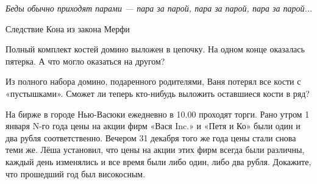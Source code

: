 \epigraph{\textit{Беды обычно приходят парами — пара за парой, пара за парой, пара за парой...}}{Следствие Кона из закона Мерфи}

\begin{thm}\label{1.10}
	Полный комплект костей домино выложен в цепочку. На одном конце оказалась пятерка. А что могло оказаться на другом?
\end{thm}


\begin{thm}\label{1.11}
	Из полного набора домино, подаренного родителями, Ваня потерял все кости с «пустышками». Сможет ли теперь кто-нибудь выложить оставшиеся кости в ряд?
\end{thm}


\begin{thm}\label{1.12}
	На бирже в городе Нью-Васюки ежедневно в 10.00 проходят торги. Рано утром 1 января N-го года цены на акции фирм «Вася Inc.» и «Петя и Ко» были один и два рубля соответственно. Вечером 31 декабря того же года цены стали снова теми же. Лёша установил, что цены на акции этих фирм всегда были различны, каждый день изменялись и все время были либо один, либо два рубля. Докажите, что прошедший год был високосным.
\end{thm}

